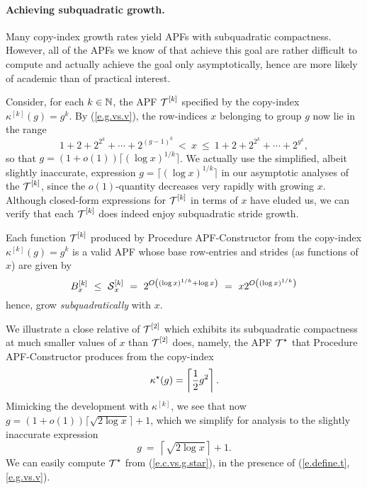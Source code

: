 \paragraph{Achieving subquadratic growth.}
Many copy-index growth rates yield APFs with subquadratic compactness.
However, all of the APFs we know of that achieve this goal are rather
difficult to compute and actually achieve the goal only
asymptotically, hence are more likely of academic than of practical
interest.

Consider, for each $k \in \mathbb{N}$, the APF $\mbox{$\cal T$}^{[k]}$ specified by the
copy-index $\kappa^{[k]}(g) = g^k$.  By (\ref{e.g.vs.v}), the
row-indices $x$ belonging to group $g$ now lie in the range
\[ 1 + 2 + 2^{2^k} + \cdots + 2^{(g-1)^k} \ < \ x \ \leq \
        1 + 2 + 2^{2^k} + \cdots + 2^{g^k}, \]
so that $g = (1 + o(1)) \lceil (\log x)^{1/k} \rceil$.  We actually
use the simplified, albeit slightly inaccurate, expression $g = \lceil
(\log x)^{1/k} \rceil$ in our asymptotic analyses of the $\mbox{$\cal T$}^{[k]}$,
since the $o(1)$-quantity decreases very rapidly with growing $x$.
Although closed-form expressions for $\mbox{$\cal T$}^{[k]}$ in terms of $x$ have
eluded us, we can verify that each $\mbox{$\cal T$}^{[k]}$ does indeed enjoy
subquadratic stride growth.

\begin{prop}
\label{p.k.subquad}
Each function $\mbox{$\cal T$}^{[k]}$ produced by Procedure {\sf APF-Constructor}
from the copy-index $\kappa^{[k]}(g) = g^k$ is a valid APF whose base
row-entries and strides (as functions of $x$) are given by
\begin{equation}
\label{e.stride.subquad}
B^{[k]}_x \ \leq \ \mbox{$\cal S$}^{[k]}_x \ = \
     2^{O \left( (\log x)^{1/k} + \log x \right)}
     \ = \ x 2^{O \left( (\log x)^{1/k} \right)}
\end{equation}
hence, grow {\em subquadratically} with $x$.
\end{prop}

We illustrate a close relative of $\mbox{$\cal T$}^{[2]}$ which exhibits its
subquadratic compactness at much smaller values of $x$ than $\mbox{$\cal T$}^{[2]}$
does, namely, the APF $\mbox{$\cal T$}^\star$ that Procedure {\sf APF-Constructor}
produces from the copy-index
\begin{equation}
\label{e.c.vs.g.star}
\kappa^\star(g) =  \left\lceil {1 \over 2} g^2 \right\rceil.
\end{equation}
Mimicking the development with $\kappa^{[k]}$, we see that now $g = (1
+ o(1)) \lceil \sqrt{2 \log x} \rceil +1$, which we simplify for
analysis to the slightly inaccurate expression
\[ g \ = \ \left\lceil \sqrt{2 \log x} \right\rceil +1.  \]
We can easily compute $\mbox{$\cal T$}^\star$ from (\ref{e.c.vs.g.star}), in the
presence of (\ref{e.define.t}, \ref{e.g.vs.v}).

